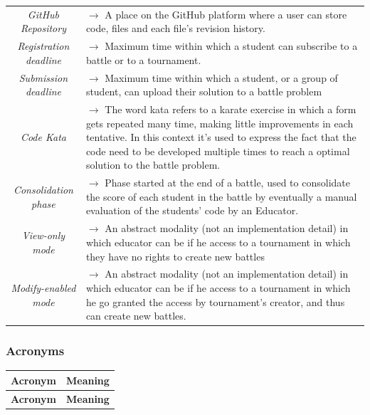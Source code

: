 \documentclass{article}
\begin{document}
{\begin{xltabular}{\textwidth}{ >{\raggedright\arraybackslash}c >{\raggedright\arraybackslash}X }
                \textit{GitHub Repository} & $\rightarrow$ A place on the GitHub platform where a user can store code, files and each file's revision history. \\
                \textit{Registration deadline} & $\rightarrow$ Maximum time within which a student can subscribe to a battle or to a tournament. \\
                \textit{Submission deadline} & $\rightarrow$ Maximum time within which a student, or a group of student, can upload their solution to a battle problem \\
                \textit{Code Kata} & $\rightarrow$ The word kata refers to a karate exercise in which a form gets repeated many time, making little improvements in each tentative.
                In this context it's used to express the fact that the code need to be developed multiple times to reach a optimal solution to the battle problem. \\
                \textit{Consolidation phase} & $\rightarrow$ Phase started at the end of a battle, used to consolidate the score of each student in the battle by eventually a manual evaluation of the students' code by an Educator. \\
                \textit{View-only mode} & $\rightarrow$ An abstract modality (not an implementation detail) in which educator can be if he access to a tournament in which they have no rights to create new battles \\
                \textit{Modify-enabled mode }& $\rightarrow$ An abstract modality (not an implementation detail) in which educator can be if he access to a tournament in which he go granted the access by tournament's creator, and thus can create new battles.
            \end{xltabular}        

    \subsubsection{Acronyms}
        \begin{xltabular}{\textwidth}{ >{\raggedright\arraybackslash}c >{\raggedright\arraybackslash}X }
            \hline 
            \textbf{Acronym} & \textbf{Meaning} \\
            \hline 
                
            \endfirsthead

            \hline 
            \textbf{Acronym} & \textbf{Meaning} \\
            \hline 


\end{xltabular}}
\end{document}
